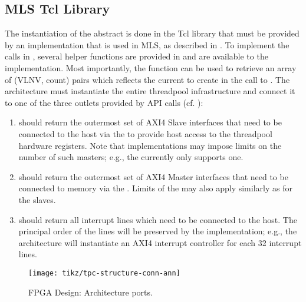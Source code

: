\subsection{MLS Tcl Library}\label{sec:ai-mls}%
The instantiation of the abstract  is done in the Tcl library that must be provided by an  implementation that is used in MLS, as described in .
To implement the calls in , several helper functions are provided in  and are available to the implementation.
Most importantly, the  function can be used to retrieve an array of (VLNV, count) pairs which reflects the current  to create in the call to .
The architecture must instantiate the entire threadpool infrastructure and connect it to one of the three outlets provided by API calls (cf. ):
%
\begin{enumerate}
  \item {} should return the outermost set of AXI4 Slave interfaces that need to be connected to the host via the  to provide host access to the threadpool hardware registers. Note that  implementations may impose limits on the number of such masters; e.g., the   currently only supports one.
  \item {} should return the outermost set of AXI4 Master interfaces that need to be connected to memory via the . Limits of the  may also apply similarly as for the slaves.
  \item {} should return all interrupt lines which need to be connected to the host. The principal order of the lines will be preserved by the  implementation; e.g., the  architecture will instantiate an AXI4 interrupt controller for each 32 interrupt lines.
\end{enumerate}
%
\begin{figure}
  \centering%
  \texttt{[image: tikz/tpc-structure-conn-ann]}
  \caption{FPGA Design: Architecture ports.}
  \label{fig:arch-ports}
\end{figure}

